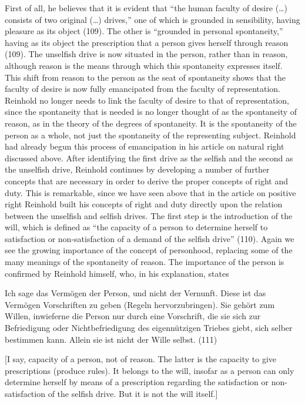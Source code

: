  First of all, he believes that it is evident that ``the human faculty of desire (\ldots ) consists of two original (\ldots ) drives,'' one of which is grounded in sensibility, having pleasure as its object (109). The other is ``grounded in personal spontaneity,'' having as its object the prescription that a person gives herself through reason (109). The unselfish drive is now situated in the person, rather than in reason, although reason is the means through which this spontaneity expresses itself. This shift from reason to the person as the seat of spontaneity shows that the faculty of desire is now fully emancipated from the faculty of representation. Reinhold no longer needs to link the faculty of desire to that of representation, since the spontaneity that is needed is no longer thought of as the spontaneity of reason, as in the theory of the degrees of spontaneity. It is the spontaneity of the person as a whole, not just the spontaneity of the representing subject. Reinhold had already begun this process of emancipation in his article on natural right discussed above. After identifying the first drive as the selfish and the second as the unselfish drive, Reinhold continues by developing a number of further concepts that are necessary in order to derive the proper concepts of right and duty. This is remarkable, since we have seen above that in the article on positive right Reinhold built his concepts of right and duty directly upon the relation between the unselfish and selfish drives. The first step is the introduction of the will, which is defined as ``the capacity of a person to determine herself to satisfaction or non{-}satisfaction of a demand of the selfish drive'' (110). Again we see the growing importance of the concept of personhood, replacing some of the many meanings of the spontaneity of reason. The importance of the person is confirmed by Reinhold himself, who, in his explanation, states 

Ich sage das Verm\"{o}gen der Person, und nicht der Vernunft. Diese ist das Verm\"{o}gen Vorschriften zu geben (Regeln hervorzubringen). Sie geh\"{o}rt zum Willen, inwieferne die Person nur durch eine Vorschrift, die sie sich zur Befriedigung oder Nichtbefriedigung des eigenn\"{u}tzigen Triebes giebt, sich selber bestimmen kann. Allein sie ist nicht der Wille selbst. (111)

[I say, capacity of a person, not of reason. The latter is the capacity to give prescriptions (produce rules). It belongs to the will, insofar as a person can only determine herself by means of a prescription regarding the satisfaction or non{-}satisfaction of the selfish drive. But it is not the will itself.]

